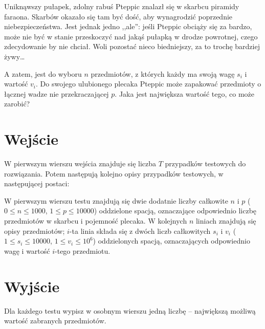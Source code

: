 \documentclass{spiral-kurs}
\begin{document}
\makeheader
%
Uniknąwszy pułapek, zdolny rabuś Pteppic znalazł się w skarbcu piramidy faraona. Skarbów okazało się tam być dość, aby wynagrodzić poprzednie niebezpieczeństwa. Jest jednak jedno ,,ale'': jeśli Pteppic obciąży się za bardzo, może nie być w stanie przeskoczyć nad jakąś pułapką w drodze powrotnej, czego zdecydowanie by nie chciał. Woli pozostać nieco biedniejszy, za to trochę bardziej żywy\ldots

A zatem, jest do wyboru $n$ przedmiotów, z których każdy ma swoją wagę $s_i$ i wartość $v_i$. Do swojego ulubionego plecaka Pteppic może zapakować przedmioty o łącznej wadze nie przekraczającej $p$. Jaka jest największa wartość tego, co może zarobić?

  \section{Wejście}

W pierwszym wierszu wejścia znajduje się liczba $T$ przypadków testowych do rozwiązania. Potem następują kolejno opisy przypadków testowych, w następującej postaci:

W pierwszym wierszu testu znajdują się dwie dodatnie liczby całkowite $n$ i $p$ ($0\leq n \leq 1000$, $1 \leq p \leq 10000$) oddzielone spacją, oznaczające odpowiednio liczbę przedmiotów w skarbcu i pojemność plecaka. W kolejnych $n$ liniach znajdują się opisy przedmiotów; $i$-ta linia składa się z dwóch liczb całkowitych $s_i$ i $v_i$ ($1 \leq s_i \leq 10000$, $1 \leq v_i \leq 10^6$) oddzielonych spacją, oznaczających odpowiednio wagę i wartość $i$-tego przedmiotu.


  \section{Wyjście}


Dla każdego testu wypisz w osobnym wierszu jedną liczbę -- największą możliwą wartość zabranych przedmiotów.



  
\end{document}
